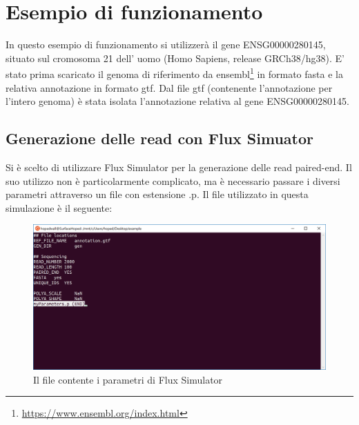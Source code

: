 \section{Esempio di funzionamento}

In questo esempio di funzionamento si utilizzerà il gene ENSG00000280145, situato sul cromosoma 21 dell' uomo (Homo Sapiens, release GRCh38/hg38). E' stato prima scaricato il genoma di riferimento da ensembl\footnote{\url{https://www.ensembl.org/index.html}} in formato fasta e la relativa annotazione in formato gtf. Dal file gtf (contenente l'annotazione per l'intero genoma) è stata isolata l'annotazione relativa al gene ENSG00000280145.

\subsection{Generazione delle read con Flux Simuator}

Si è scelto di utilizzare Flux Simulator \cite{griebel2012modelling} per la generazione delle read paired-end. Il suo utilizzo non è particolarmente complicato, ma è necessario passare i diversi parametri attraverso un file con estensione .p. Il file utilizzato in questa simulazione è il seguente:

%
%

\begin{figure}[h]
	\centering
	\includegraphics[width=\linewidth]{images/myParameters.png}
  \caption{Il file contente i parametri di Flux Simulator}
  \label{fig:Parameters}
\end{figure}

